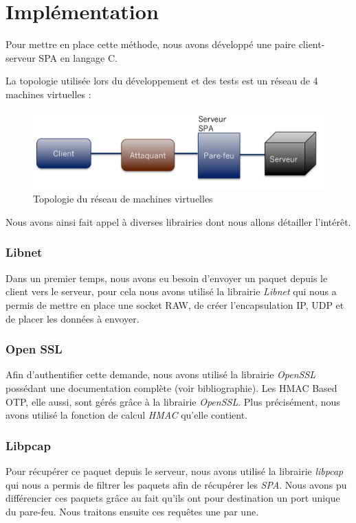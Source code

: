 \chapter{Implémentation}

Pour mettre en place cette méthode, nous avons développé une paire client-serveur SPA en langage C.

La topologie utilisée lors du développement et des tests est un réseau de 4 machines virtuelles : 

\begin{figure}[h]

\centerline{\includegraphics[scale=0.5]{topo_imple}}
\caption{Topologie du réseau de machines virtuelles}

\end{figure}
Nous avons ainsi fait appel à diverses librairies dont nous allons détailler l'intérêt.

\subsection{Libnet}
Dans un premier temps, nous avons eu besoin d'envoyer un paquet depuis le client vers le serveur, pour cela nous avons utilisé la librairie \emph{Libnet} qui nous a permis de mettre en place une socket RAW, de créer l'encapsulation IP, UDP et de placer les données à envoyer.

\subsection{Open SSL}
Afin d'authentifier cette demande, nous avons utilisé la librairie \emph{OpenSSL} possédant une documentation complète (voir bibliographie).
Les HMAC Based OTP, elle aussi, sont gérés grâce à la librairie \emph{OpenSSL}. Plus précisément, nous avons utilisé la fonction de calcul \emph{HMAC} qu'elle contient.

\subsection{Libpcap}
Pour récupérer ce paquet depuis le serveur, nous avons utilisé la librairie \emph{libpcap} qui nous a permis de filtrer les paquets afin de récupérer les \emph{SPA}. Nous avons pu différencier ces paquets grâce au fait qu'ils ont pour destination un port unique du pare-feu. Nous traitons ensuite ces requêtes une par une.

